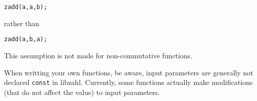 \begin{alltt}
   zadd(a, a, b);
\end{alltt}

\noindent
rather than

\begin{alltt}
   zadd(a, b, a);
\end{alltt}

\noindent
This assumption is not made for non-commutative
functions.

When writting your own functions, be aware,
input parameters are generally not declared {\tt const}
in libzahl. Currently, some functions actually make
modifications (that do not affect the value) to
input parameters.
